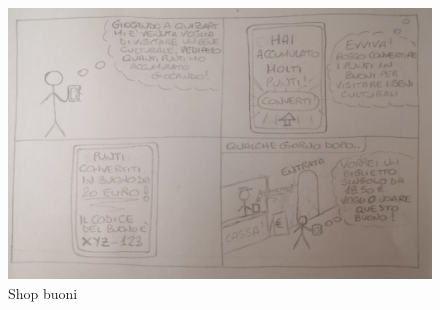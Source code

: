 \documentclass{article}
\begin{document}
\begin{figure}[htp]
\begin{center}
\includegraphics[width=1 \textwidth]{Storyboard Task 3.png}
\caption{Shop buoni}
\end{center}
\end{figure} 
\end{document}
